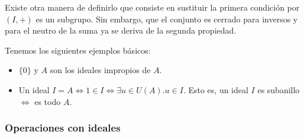 Existe otra manera de definirlo que consiste en sustituir la primera condición por $(I,+)$ es un subgrupo. Sin embargo, que el conjunto es cerrado para inversos y para el neutro de la suma ya se deriva de la segunda propiedad. 

\begin{example}
Tenemos los siguientes ejemplos básicos:

\begin{itemize}
\item $\{0\}$ y $A$ son los ideales impropios de $A$. 
\item Un ideal $I = A \iff 1 \in I \iff \exists u \in U(A).u \in I$. Esto es, un ideal $I$ es subanillo $\iff$ es todo $A$. 
\end{itemize}
\end{example}

\subsubsection{Operaciones con ideales}

